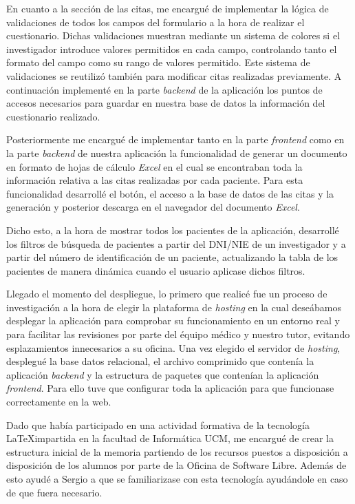 En cuanto a la sección de las citas, me encargué de implementar la lógica de validaciones de todos los campos del formulario a la hora de realizar el cuestionario. Dichas validaciones muestran mediante un sistema de colores si el investigador introduce valores permitidos en cada campo, controlando tanto el formato del campo como su rango de valores permitido. Este sistema de validaciones se reutilizó también para modificar citas realizadas previamente. A continuación implementé en la parte \textit{backend} de la aplicación los puntos de accesos necesarios para guardar en nuestra base de datos la información  del cuestionario realizado. \newline

Posteriormente me encargué de implementar tanto en la parte \textit{frontend} como en la parte \textit{backend} de nuestra aplicación la funcionalidad de generar un documento en formato de hojas de cálculo \textit{Excel} en el cual se encontraban toda la información relativa a las citas realizadas por cada paciente. Para esta funcionalidad desarrollé el botón, el acceso a la base de datos de las citas y la generación y posterior descarga en el navegador del documento \textit{Excel}. \newline

Dicho esto, a la hora de mostrar todos los pacientes de la aplicación, desarrollé los filtros de búsqueda de pacientes a partir del DNI/NIE de un investigador y a partir del número de identificación de un paciente, actualizando la tabla de los pacientes de manera dinámica cuando el usuario aplicase dichos filtros. \newline

Llegado el momento del despliegue, lo primero que realicé fue un proceso de investigación a la hora de elegir la plataforma de \textit{hosting} en la cual deseábamos desplegar la aplicación para comprobar su funcionamiento en un entorno real y para facilitar las revisiones por parte del équipo médico y nuestro tutor, evitando esplazamientos innecesarios a su oficina. Una vez elegido el servidor de \textit{hosting}, desplegué la base datos relacional, el archivo comprimido que contenía la aplicación \textit{backend} y la estructura de paquetes que contenían la aplicación \textit{frontend}. Para ello tuve que configurar toda la aplicación para que funcionase correctamente en la web. \newline

Dado que había participado en una actividad formativa de la tecnología \LaTeX  impartida en la facultad de Informática UCM, me encargué de crear la estructura inicial de la memoria partiendo de los recursos puestos a disposición a disposición de los alumnos por parte de la Oficina de Software Libre. Además de esto ayudé a Sergio  a que se familiarizase con esta tecnología ayudándole en caso de que fuera necesario. \newline







